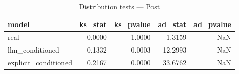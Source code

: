 \begin{table}
\caption{Distribution tests — Post}
\label{tab:dist_Post}
\begin{tabular}{lrrrr}
\toprule
model & ks\_stat & ks\_pvalue & ad\_stat & ad\_pvalue \\
\midrule
real & 0.0000 & 1.0000 & -1.3159 & NaN \\
llm\_conditioned & 0.1332 & 0.0003 & 12.2993 & NaN \\
explicit\_conditioned & 0.2167 & 0.0000 & 33.6762 & NaN \\
\bottomrule
\end{tabular}
\end{table}
